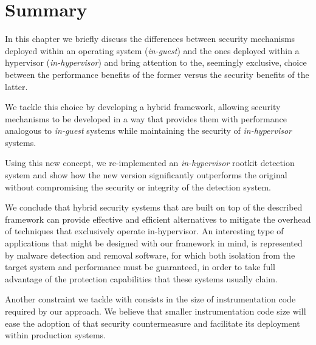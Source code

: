 \section{Summary}\label{hf:conclusion}
In this chapter we briefly discuss the differences between security mechanisms 
deployed within an operating system (\textit{in-guest}) and the ones deployed 
within a hypervisor (\textit{in-hypervisor}) and bring attention to the, 
seemingly exclusive, choice between the performance benefits of the former 
versus the security benefits of the latter. 

We tackle this choice by developing a hybrid framework, allowing security mechanisms 
to be developed in a way that provides them with performance analogous to \textit{in-guest} 
systems while maintaining the security of \textit{in-hypervisor} systems. 

Using this new concept, we re-implemented an \textit{in-hypervisor} rootkit detection
system and show how the new version significantly outperforms the original
without compromising the security or integrity of the detection system.

We conclude that hybrid security systems that are built on top of the described 
framework can provide effective and efficient alternatives to mitigate the
overhead of techniques that exclusively operate in-hypervisor.
An interesting type of applications that might be designed with our framework in mind, is represented by malware
detection and removal software, for which both isolation from the target system and 
performance must be guaranteed, in order to take full advantage of the protection capabilities that these systems usually claim.

Another constraint we tackle with consists in the size of instrumentation code required 
by our approach. We believe that smaller instrumentation code size will ease the 
adoption of that security countermeasure and facilitate its deployment within production 
systems.

